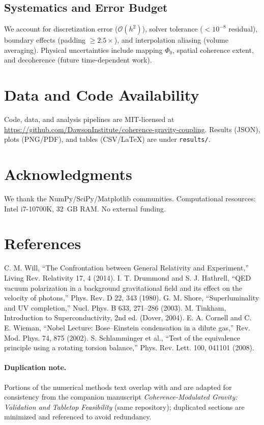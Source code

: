 \documentclass[10pt,twocolumn]{article}
\begin{document}
\subsection{Systematics and Error Budget}
We account for discretization error ($\mathcal{O}(h^2)$), solver tolerance ($<10^{-8}$ residual), boundary effects (padding $\ge 2.5\times$), and interpolation aliasing (volume averaging). Physical uncertainties include mapping $\Phi_0$, spatial coherence extent, and decoherence (future time-dependent work).

\section{Data and Code Availability}
Code, data, and analysis pipelines are MIT-licensed at\: \url{https://github.com/DawsonInstitute/coherence-gravity-coupling}. Results (JSON), plots (PNG/PDF), and tables (CSV/LaTeX) are under \texttt{results/}. 

\section*{Acknowledgments}
We thank the NumPy/SciPy/Matplotlib communities. Computational resources: Intel i7-10700K, 32~GB RAM. No external funding.

\section*{References}
\begin{thebibliography}{9}
 C. M. Will, ``The Confrontation between General Relativity and Experiment,'' Living Rev. Relativity 17, 4 (2014).
 I. T. Drummond and S. J. Hathrell, ``QED vacuum polarization in a background gravitational field and its effect on the velocity of photons,'' Phys. Rev. D 22, 343 (1980).
 G. M. Shore, ``Superluminality and UV completion,'' Nucl. Phys. B 633, 271--286 (2003).
 M. Tinkham, Introduction to Superconductivity, 2nd ed. (Dover, 2004).
 E. A. Cornell and C. E. Wieman, ``Nobel Lecture: Bose--Einstein condensation in a dilute gas,'' Rev. Mod. Phys. 74, 875 (2002).
 S. Schlamminger et al., ``Test of the equivalence principle using a rotating torsion balance,'' Phys. Rev. Lett. 100, 041101 (2008).
\end{thebibliography}

\paragraph{Duplication note.} Portions of the numerical methods text overlap with and are adapted for consistency from the companion manuscript \emph{Coherence-Modulated Gravity: Validation and Tabletop Feasibility} (same repository); duplicated sections are minimized and referenced to avoid redundancy.
\end{document}
